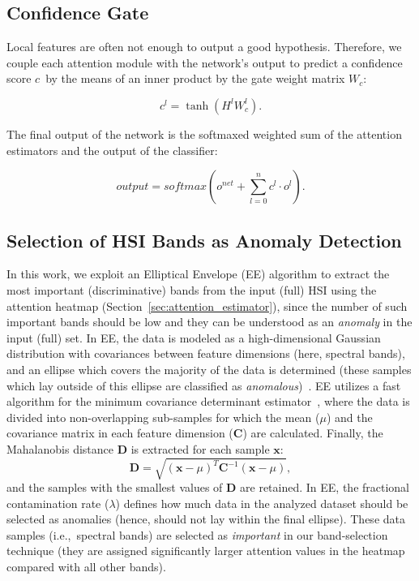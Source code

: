 \documentclass[journal]{IEEEtran}
\newcommand{\MeanSubsample}{{\mu}}
\newcommand{\CovarianceMatrix}{\bm{C}}
\newcommand{\MahalanobisDistance}{\bm{D}}
\newcommand{\Sample}{\bm{x}}
\newcommand{\ContaminationRate}{\lambda}
\newcommand{\ConfidenceScore}{$c$}
\begin{document}
\subsection{Confidence Gate}

Local features are often not enough to output a good hypothesis. Therefore, we couple each attention module with the network's output to predict a confidence score \ConfidenceScore~by the means of an inner product by the gate weight matrix $W_c$:

\begin{equation}
c^{l}=\tanh(H^{l}W^{l}_c).
\end{equation}

\noindent The final output of the network is the softmaxed weighted sum of the attention estimators and the output of the classifier:

\begin{equation}
output = softmax(o^{net} + \sum\limits_{l=0}^n c^{l}\cdot o^{l}).
\end{equation}

\subsection{Selection of HSI Bands as Anomaly Detection}

In this work, we exploit an Elliptical Envelope (EE) algorithm to extract the most important (discriminative) bands from the input (full) HSI using the attention heatmap (Section~\ref{sec:attention_estimator}), since the number of such important bands should be low and they can be understood as an \emph{anomaly} in the input (full) set. In EE, the data is modeled as a high-dimensional Gaussian distribution with covariances between feature dimensions (here, spectral bands), and an ellipse which covers the majority of the data is determined (these samples which lay outside of this ellipse are classified as \emph{anomalous})~\cite{Hoyle2015anomaly}. EE utilizes a fast algorithm for the minimum covariance determinant estimator~\cite{doi:10.1080/00401706.1999.10485670}, where the data is divided into non-overlapping sub-samples for which the mean ($\MeanSubsample$) and the covariance matrix in each feature dimension ($\CovarianceMatrix$) are calculated. Finally, the Mahalanobis distance $\MahalanobisDistance$ is extracted for each sample $\Sample$:
\begin{equation}
\MahalanobisDistance=\sqrt{(\Sample-\MeanSubsample)^T\CovarianceMatrix^{-1}(\Sample-\MeanSubsample)},
\end{equation}
\noindent and the samples with the smallest values of $\MahalanobisDistance$ are retained. In EE, the fractional contamination rate ($\ContaminationRate$) defines how much data in the analyzed dataset should be selected as anomalies (hence, should not lay within the final ellipse). These data samples (i.e.,~spectral bands) are selected as \emph{important} in our band-selection technique (they are assigned significantly larger attention values in the heatmap compared with all other bands).
\end{document}
